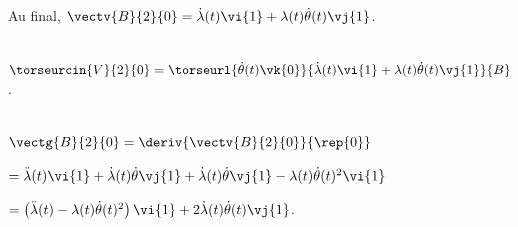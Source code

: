 Au final, $\vectv{B}{2}{0}=\dot{\lambda}(t)\vi{1}+\lambda(t)\dot{\theta}(t)\vj{1}$.

\else
\fi

\ifprof  ~\\
$\torseurcin{V}{2}{0} = \torseurl{\dot{\theta}(t)\vk{0}}{\dot{\lambda}(t)\vi{1}+\lambda(t)\dot{\theta}(t)\vj{1}}{B}$.
\else
\fi

\ifprof  ~\\
$\vectg{B}{2}{0} = \deriv{\vectv{B}{2}{0}}{\rep{0}}$

$ = \ddot{\lambda}(t)\vi{1}+  \dot{\lambda}(t)\dot{\theta}\vj{1}+\dot{\lambda}(t)\dot{\theta}\vj{1}-\lambda(t)\dot{\theta}(t)^2\vi{1}$

$ = \left( \ddot{\lambda}(t)-\lambda(t)\dot{\theta}(t)^2\right)\vi{1}  +  2 \dot{\lambda}(t)\dot{\theta}(t) \vj{1}$.
\else
\fi

